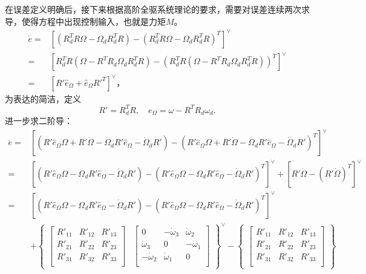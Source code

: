 在误差定义明确后，接下来根据高阶全驱系统理论的要求，需要对误差连续两次求导，使得方程中出现控制输入，也就是力矩$M$。
$$\begin{aligned}
    \dot e=&[(R_d^TR \Omega-\Omega_dR_d^TR)-(R_d^TR \Omega-\Omega_dR_d^TR)^T]^\vee\\
    =&[R_d^TR(\Omega-R^TR_d \Omega_dR_d^TR)-(R_d^TR(\Omega-R^TR_d \Omega_dR_d^TR))^T]^\vee \\
    =&[R' \hat e_\Omega  + \hat e_\Omega R'^T]^\vee，
\end{aligned} $$
为表达的简洁，定义
    $$R'=R_d^TR, \quad e_\Omega=\omega -R^TR_d \omega_d.$$
进一步求二阶导：
    $$\begin{aligned}
        \ddot e =& [(R' \hat e_\Omega \Omega + R'\dot \Omega -\Omega_d R' \hat e_\Omega -\dot \Omega_d R')-(R' \hat e_\Omega \Omega + R'\dot \Omega -\Omega_d R' \hat e_\Omega -\dot \Omega_d R')^T]^\vee\\
        =&[(R' \hat e_\Omega \Omega  -\Omega_d R' \hat e_\Omega -\dot \Omega_d R')-(R' \hat e_\Omega \Omega  -\Omega_d R' \hat e_\Omega -\dot \Omega_d R')^T]^\vee+[R'\dot \Omega-(R'\dot \Omega)^T]^\vee\\
        =&[(R' \hat e_\Omega \Omega  -\Omega_d R' \hat e_\Omega -\dot \Omega_d R')-(R' \hat e_\Omega \Omega  -\Omega_d R' \hat e_\Omega -\dot \Omega_d R')^T]^\vee\\
        & + \begin{Bmatrix}
        \begin{bmatrix}
        R'_{11} &R'_{12}  & R'_{13} \\
        R'_{21} & R'_{22} & R'_{23} \\
        R'_{31} & R'_{32} &R'_{33}  \\
        \end{bmatrix}&\begin{bmatrix}
        0 & -\dot\omega_3 &\dot\omega_2  \\
         \dot\omega_3& 0 &  -\dot\omega_1\\
         -\dot\omega_2&\dot\omega_1  & 0 \\
        \end{bmatrix}\end{Bmatrix}^\vee -\begin{Bmatrix}
        \begin{bmatrix}
        R'_{11} &R'_{12}  & R'_{13} \\
        R'_{21} & R'_{22} & R'_{23} \\
        R'_{31} & R'_{32} &R'_{33}  \\

\end{bmatrix}
\end{Bmatrix}
\end{aligned}$$
